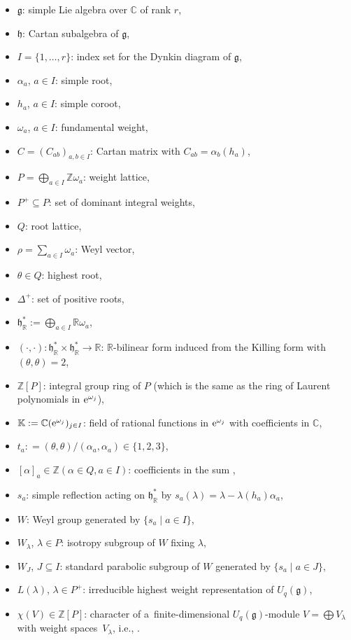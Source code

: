 \documentclass[pdftex]{sigma}
\numberwithin{equation}{section}
\theoremstyle{definition}
\newcommand{\Z}{\mathbb{Z}}
\newcommand{\R}{\mathbb{R}}
\newcommand{\C}{\mathbb{C}}
\newcommand{\K}{\mathbb{K}}
\newcommand{\g}{\mathfrak{g}}
\newcommand{\h}{\mathfrak{h}}
\newcommand\uqg{U_q(\g)}
\newcommand\posR{\Delta^{+}}
\newcommand\la{\lambda}
\begin{document}
\begin{itemize}\itemsep=0pt
\item $\g$: simple Lie algebra over $\C$ of rank $r$,
\item $\h$: Cartan subalgebra of $\g$,
\item $I=\{1,\dots, r\}$: index set for the Dynkin diagram of $\g$,
\item $\alpha_a$, $a\in I$: simple root,
\item $h_a$, $a\in I$: simple coroot,
\item $\omega_a$, $a\in I$: fundamental weight,
\item $C = (C_{ab})_{a,b\in I}$: Cartan matrix with $C_{ab}=\alpha_b(h_a)$,
\item $P=\bigoplus_{a\in I}\Z\omega_a$: weight lattice,
\item $P^{+}\subseteq P$: set of dominant integral weights,
\item $Q$: root lattice,
\item $\rho = \sum_{a\in I}\omega_a$: Weyl vector,
\item $\theta\in Q$: highest root,
\item $\posR$: set of positive roots,
\item $\h_{\R}^{*}:=\bigoplus_{a\in I}\R\omega_a$,
\item $(\cdot,\cdot)\colon \h_{\R}^{*}\times \h_{\R}^{*} \to \R$: $\R$-bilinear form induced from the Killing form with $(\theta,\theta)=2$,
\item $\Z[P]$: integral group ring of $P$ (which is the same as the ring \smash{$\Z\big[{\rm e}^{\pm \omega_j}\big]_{j\in I}$} of Laurent polynomials in ${\rm e}^{\omega_j}$),
\item $\K:=\C({\rm e}^{\omega_j})_{j\in I}$: field of rational functions in ${\rm e}^{\omega_j}$ with coefficients in $\C$,
\item $t_a: =(\theta,\theta)/(\alpha_a,\alpha_a)\in \{1,2,3\}$,
\item $[\alpha]_a\in \Z (\alpha \in Q,a\in I)$: coefficients in the sum ,
\item $s_a$: simple reflection acting on $\h_{\R}^{*}$ by $s_a(\la) = \la - \la(h_a)\alpha_a$,
\item $W$: Weyl group generated by $\{s_a \mid a\in I\}$,
\item $W_{\la}$, $\la\in P$: isotropy subgroup of $W$ fixing $\la$,
\item $W_{J}$, $J\subseteq I$: standard parabolic subgroup of $W$ generated by $\{s_a \mid a\in J\}$,
\item $L(\la)$, $\la \in P^{+}$: irreducible highest weight representation of $\uqg$,
\item $\chi(V)\in \Z[P]$: character of a~finite-dimensional $\uqg$-module $V=\bigoplus V_{\la}$ with weight spaces~$V_{\la}$, i.e., \smash{$\chi(V)=\sum_{\la\in P}(\dim V_{\la}){\rm e}^{\la}$}.
\end{itemize}
\end{document}
